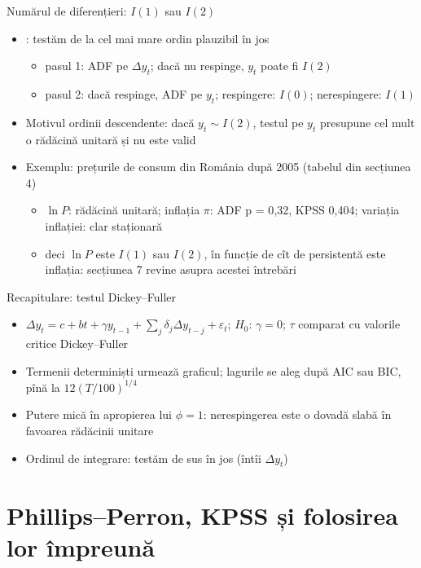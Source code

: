 \begin{frame}{Numărul de diferențieri: $I(1)$ sau $I(2)$}
\itemsize{\small}
\begin{itemize}
    \item {}: testăm de la cel mai mare ordin plauzibil în jos
    \begin{itemize}
        \item pasul 1: ADF pe $\Delta y_t$; dacă nu respinge, $y_t$ poate fi $I(2)$
        \item pasul 2: dacă respinge, ADF pe $y_t$; respingere: $I(0)$; nerespingere: $I(1)$
    \end{itemize}
    \item Motivul ordinii descendente: dacă $y_t \sim I(2)$, testul pe $y_t$ presupune cel mult o rădăcină unitară și nu este valid
    \item Exemplu: prețurile de consum din România după 2005 (tabelul din secțiunea 4)
    \begin{itemize}
        \item $\ln P$: rădăcină unitară; inflația $\pi$: ADF p = 0{,}32, KPSS 0{,}404; variația inflației: clar staționară
        \item deci $\ln P$ este $I(1)$ sau $I(2)$, în funcție de cît de persistentă este inflația: secțiunea 7 revine asupra acestei întrebări
    \end{itemize}
\end{itemize}
\end{frame}

\begin{frame}{Recapitulare: testul Dickey--Fuller}
\itemsize{\small}
\begin{itemize}
    \item $\Delta y_t = c + bt + \gamma y_{t-1} + \sum_j\delta_j\Delta y_{t-j} + \varepsilon_t$; $H_0$: $\gamma = 0$; $\tau$ comparat cu valorile critice Dickey--Fuller
    \item Termenii determiniști urmează graficul; lagurile se aleg după AIC sau BIC, pînă la $12(T/100)^{1/4}$
    \item Putere mică în apropierea lui $\phi = 1$: nerespingerea este o dovadă slabă în favoarea rădăcinii unitare
    \item Ordinul de integrare: testăm de sus în jos (întîi $\Delta y_t$)
\end{itemize}
\end{frame}


\section{Phillips--Perron, KPSS și folosirea lor împreună}

